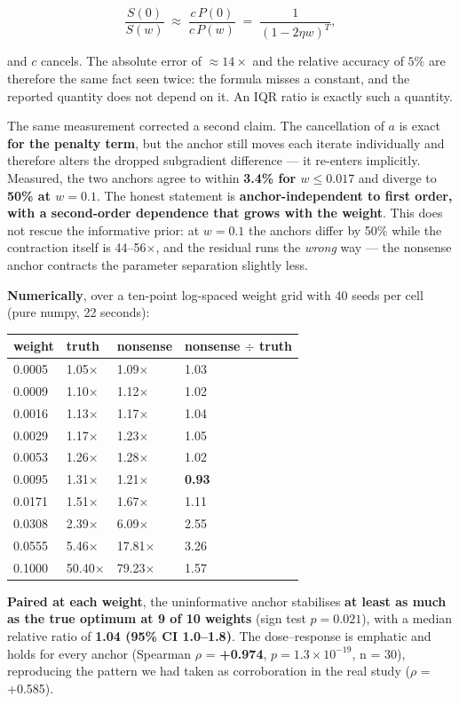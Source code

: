 \[\frac{S(0)}{S(w)} \;\approx\; \frac{c\,P(0)}{c\,P(w)} \;=\; \frac{1}{(1-2\eta w)^T},\]

and \(c\) cancels. The absolute error of \(\approx 14\times\) and the relative accuracy of \(5\%\) are
therefore the same fact seen twice: the formula misses a constant, and the reported quantity does
not depend on it. An IQR ratio is exactly such a quantity.

The same measurement corrected a second claim. The cancellation of \(a\) is exact \textbf{for the penalty
term}, but the anchor still moves each iterate individually and therefore alters the dropped
subgradient difference --- it re-enters implicitly. Measured, the two anchors agree to within
\textbf{3.4\% for \(w \leq 0.017\)} and diverge to \textbf{50\% at \(w = 0.1\)}. The honest statement is
\textbf{anchor-independent to first order, with a second-order dependence that grows with the weight}.
This does not rescue the informative prior: at \(w = 0.1\) the anchors differ by 50\% while the
contraction itself is 44--56\(\times\), and the residual runs the \emph{wrong} way --- the nonsense anchor
contracts the parameter separation slightly less.

\textbf{Numerically}, over a ten-point log-spaced weight grid with 40 seeds per cell
(pure numpy, 22 seconds):

\begin{longtable}[]{@{}llll@{}}
\toprule
weight & truth & nonsense & nonsense $\div$ truth\tabularnewline
\midrule
\endhead
0.0005 & 1.05$\times$ & 1.09$\times$ & 1.03\tabularnewline
0.0009 & 1.10$\times$ & 1.12$\times$ & 1.02\tabularnewline
0.0016 & 1.13$\times$ & 1.17$\times$ & 1.04\tabularnewline
0.0029 & 1.17$\times$ & 1.23$\times$ & 1.05\tabularnewline
0.0053 & 1.26$\times$ & 1.28$\times$ & 1.02\tabularnewline
0.0095 & 1.31$\times$ & 1.21$\times$ & \textbf{0.93}\tabularnewline
0.0171 & 1.51$\times$ & 1.67$\times$ & 1.11\tabularnewline
0.0308 & 2.39$\times$ & 6.09$\times$ & 2.55\tabularnewline
0.0555 & 5.46$\times$ & 17.81$\times$ & 3.26\tabularnewline
0.1000 & 50.40$\times$ & 79.23$\times$ & 1.57\tabularnewline
\bottomrule
\end{longtable}

\textbf{Paired at each weight}, the uninformative anchor stabilises \textbf{at least as much as the true
optimum at 9 of 10 weights} (sign test \textbf{\(p = 0.021\)}), with a median relative ratio of
\textbf{1.04 (95\% CI 1.0--1.8)}. The dose--response is emphatic and holds for every anchor
(Spearman $\rho$ = \textbf{+0.974}, \(p = 1.3 \times 10^{-19}\), n = 30), reproducing the pattern we had taken as
corroboration in the real study ($\rho$ = +0.585).

